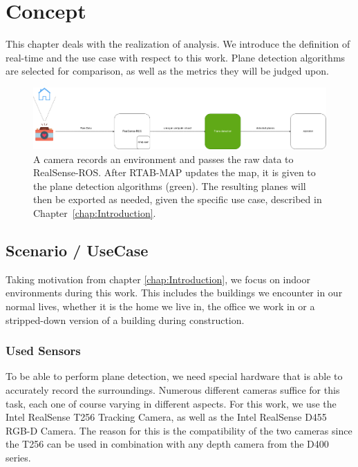 \documentclass[main.tex]{subfiles}
\begin{document}
\chapter{Concept} \label{chap:Concept}

This chapter deals with the realization of analysis.
We introduce the definition of real-time and the use case with respect to this work.
Plane detection algorithms are selected for comparison, as well as the metrics they will be judged upon.

\begin{figure}[!ht]
	\centering
	\includegraphics[width=15 cm]{images/concept.png}
    \caption{A camera records an environment and passes the raw data to
    RealSense-ROS. After RTAB-MAP updates the map, it is given to the plane detection algorithms (green). The resulting planes will 
    then be exported as needed, given the specific use case, described in Chapter~\ref{chap:Introduction}.}
\end{figure}


\section{Scenario / UseCase}
Taking motivation from chapter \ref{chap:Introduction}, we focus on indoor environments during this work.
This includes the buildings we encounter in our normal lives, whether it is the home we live in, the office we work in or a stripped-down version of a building during construction.


\subsection{Used Sensors}
To be able to perform plane detection, we need special hardware that is able to accurately record the surroundings.
Numerous different cameras suffice for this task, each one of course varying in different aspects.
For this work, we use the Intel RealSense T256 Tracking Camera, as well as the Intel RealSense D455 RGB-D Camera.
The reason for this is the compatibility of the two cameras since the T256 can be used in combination with any depth camera from the D400 series.
\end{document}
